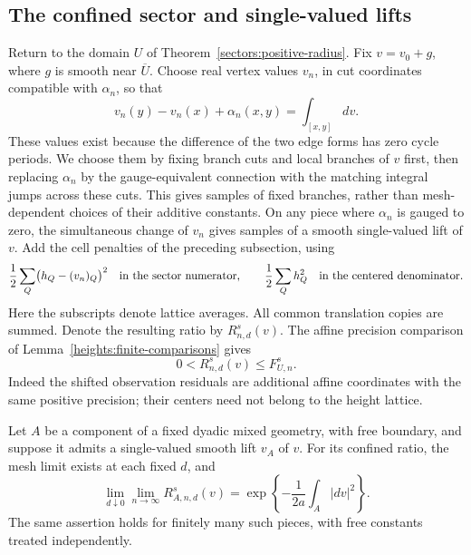 \subsection{The confined sector and single-valued lifts}

Return to the domain \(U\) of Theorem~\ref{sectors:positive-radius}.
Fix \(v=v_0+g\), where \(g\) is smooth near \(\overline U\).
Choose real vertex values \(v_n\), in cut coordinates compatible with
\(\alpha_n\), so that
\[
 v_n(y)-v_n(x)+\alpha_n(x,y)=\int_{[x,y]}dv .
\]
These values exist because the difference of the two edge forms has
zero cycle periods. We choose them by fixing branch cuts and local
branches of \(v\) first, then replacing \(\alpha_n\) by the
gauge-equivalent connection with the matching integral jumps across
these cuts. This gives samples of fixed branches, rather than
mesh-dependent choices of their additive constants.
On any piece where \(\alpha_n\) is gauged to zero,
the simultaneous change of \(v_n\) gives samples of a smooth
single-valued lift of \(v\). Add the cell penalties of the preceding
subsection, using
\[
 \frac12\sum_Q\bigl(h_Q-(v_n)_Q\bigr)^2
 \quad\hbox{in the sector numerator},\qquad
 \frac12\sum_Qh_Q^2
 \quad\hbox{in the centered denominator}.
\]
Here the subscripts denote lattice averages. All common translation
copies are summed. Denote the resulting ratio by \(R_{n,d}^s(v)\).
The affine precision comparison of
Lemma~\ref{heights:finite-comparisons} gives
\begin{equation}
 0<R_{n,d}^s(v)\le F_{U,n}^s.
 \label{sectors:confinement-lower}
\end{equation}
Indeed the shifted observation residuals are additional affine
coordinates with the same positive precision; their centers need not
belong to the height lattice.

\begin{lemma}\label{sectors:single-lift}
Let \(A\) be a component of a fixed dyadic mixed geometry, with free
boundary, and suppose it admits a single-valued smooth lift \(v_A\)
of \(v\). For its confined ratio,
the mesh limit exists at each fixed \(d\), and
\[
 \lim_{d\downarrow0}\lim_{n\to\infty} R_{A,n,d}^s(v)
   =\exp\left\{-\frac1{2a}\int_A|dv|^2\right\}.
\]
The same assertion holds for finitely many such pieces, with free
constants treated independently.
\end{lemma}


